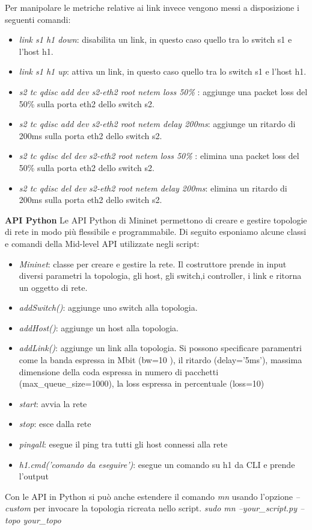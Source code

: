 Per manipolare le metriche relative ai link invece vengono messi a disposizione i seguenti comandi:
\begin{itemize}
    \item \textit{ link s1 h1 down}: disabilita un link, in questo caso quello tra lo switch s1 e l'host h1.
    \item \textit{ link s1 h1 up}: attiva un link, in questo caso quello tra lo switch s1 e l'host h1.
    \item \textit{s2 tc qdisc add dev s2-eth2 root netem loss 50\% }: aggiunge una packet loss del 50\% sulla porta eth2 dello switch s2.
    \item \textit{s2 tc qdisc add dev s2-eth2 root netem delay 200ms}: aggiunge un ritardo di 200ms sulla porta eth2 dello switch s2.
    \item \textit{s2 tc qdisc del dev s2-eth2 root netem loss 50\% }: elimina una packet loss del 50\% sulla porta eth2 dello switch s2.
    \item \textit{s2 tc qdisc del dev s2-eth2 root netem delay 200ms}: elimina un ritardo di 200ms sulla porta eth2 dello switch s2.
\end{itemize} 
\textbf{API Python}
\newline Le API Python di Mininet permettono di creare e gestire topologie di rete in modo più flessibile e programmabile. 
Di seguito esponiamo alcune classi e comandi della Mid-level API utilizzate negli script:
\begin{itemize}
    \item \textit{Mininet}: classe per creare e gestire la rete. Il costruttore prende in input diversi parametri la topologia, gli host, gli switch,i controller, i link e ritorna un oggetto di rete.
    \item \textit{addSwitch()}: aggiunge uno switch alla topologia.
    \item \textit{addHost()}: aggiunge un host alla topologia.
    \item \textit{addLink()}: aggiunge un link alla topologia. Si possono specificare paramentri come la banda espressa in Mbit (bw=10 ), il ritardo (delay='5ms'), massima dimensione della coda espressa in numero di pacchetti (max\_queue\_size=1000), la loss espressa in percentuale (loss=10)
    \item \textit{start}: avvia la rete
    \item \textit{stop}: esce dalla rete
    \item \textit{pingall}: esegue il ping tra tutti gli host connessi alla rete
    \item \textit{h1.cmd('comando da eseguire')}: esegue un comando su h1 da CLI e prende l'output
\end{itemize}
Con le API in Python si può anche estendere il comando \textit{mn} usando l'opzione \textit{--custom} per invocare la topologia ricreata nello script.
\newline \textit{sudo mn --your\_script.py --topo your\_topo}

